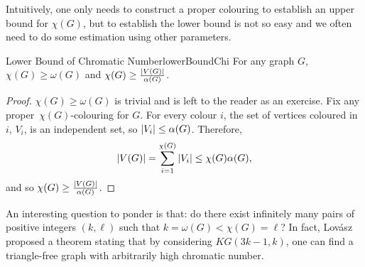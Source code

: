 \documentclass[math]{amznotes}
\theoremstyle{remark}
\newcommand{\0}{\mathbf{0}}
\newcommand{\1}{\mathbf{1}}
\begin{document}
Intuitively, one only needs to construct a proper colouring to establish an upper bound for $\chi(G)$, but to establish the lower bound is not so easy and we often need to do some estimation using other parameters.
\begin{probox}{Lower Bound of Chromatic Number}{lowerBoundChi}
    For any graph $G$, $\chi(G) \geq \omega(G)$ and $\chi(G) \geq \frac{{\left\lvert {V(G)} \right\rvert}}{\alpha(G)}$.
    \tcblower
    \begin{proof}
        $\chi(G) \geq \omega(G)$ is trivial and is left to the reader as an exercise. Fix any proper~$\chi(G)$-colouring for $G$. For every colour $i$, the set of vertices coloured in $i$, $V_i$, is an independent set, so ${\left\lvert {V_i} \right\rvert} \leq \alpha(G)$. Therefore,
        \begin{equation*}
            {\left\lvert {V(G)} \right\rvert} = \sum_{i = 1}^{\chi(G)}{\left\lvert {V_i} \right\rvert} \leq \chi(G)\alpha(G),
        \end{equation*}
        and so $\chi(G) \geq \frac{{\left\lvert {V(G)} \right\rvert}}{\alpha(G)}$.
    \end{proof}
\end{probox}
An interesting question to ponder is that: do there exist infinitely many pairs of positive integers $(k, \ell)$ such that $k = \omega(G) < \chi(G) = \ell$? In fact, Lov\'{a}sz proposed a theorem stating that by considering $KG(3k - 1, k)$, one can find a triangle-free graph with arbitrarily high chromatic number.
\end{document}
